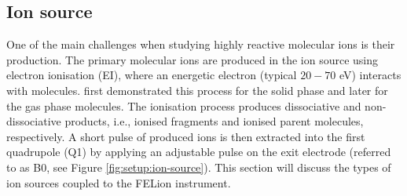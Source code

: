 \subsection{Ion source}
\label{subsec:setup:ion-source}

One of the main challenges when studying highly reactive molecular ions is their production. The primary molecular ions are produced in the ion source using electron ionisation (EI), where an energetic electron (typical $20-70$ eV) interacts with molecules. \citet{dempster_new_1918} first demonstrated this process for the solid phase and later \citet{bleakney_new_1929} for the gas phase molecules. The ionisation process produces dissociative and non-dissociative products, i.e., ionised fragments and ionised parent molecules, respectively. A short pulse of produced ions is then extracted into the first quadrupole (Q1) by applying an adjustable pulse on the exit electrode (referred to as B0, see Figure \ref{fig:setup:ion-source}). This section will discuss the types of ion sources coupled to the FELion instrument.\\

